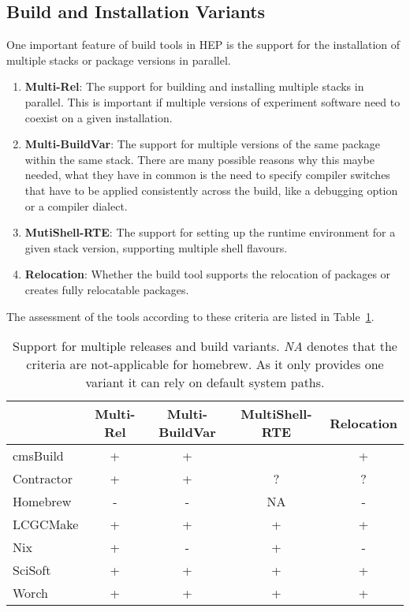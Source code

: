\documentclass[12pt,a4paper]{article}
\begin{document}
\subsection{Build and Installation Variants}
One important feature of build tools in HEP is the support for the installation of multiple stacks or package versions in parallel. 
\begin{enumerate}
\item \textbf{Multi-Rel}: The support for building and installing multiple stacks in parallel. This is important if multiple versions of experiment software need to coexist on a given installation.
\item \textbf{Multi-BuildVar}: The support for multiple versions of the same package within the same stack. There are many possible reasons why this maybe needed, what they have in common is the need to specify compiler switches that have to be applied consistently across the build, like a debugging option or a compiler dialect.
\item \textbf{MutiShell-RTE}: The support for setting up the runtime environment for a given stack version, supporting multiple shell flavours.
\item \textbf{Relocation}: Whether the build tool supports the relocation of packages or creates fully relocatable packages.
\end{enumerate}

The assessment of the tools according to these criteria are listed in Table~\ref{tab:taxonomyVariants}.

\begin{table}
\centering
\begin{tabular}{lcccc}
&Multi-Rel & Multi-BuildVar & MultiShell-RTE & Relocation \\ \hline
cmsBuild & \cellcolor{green} +  & \cellcolor{green} + & \cellcolor{green} & \cellcolor{green} + \\
Contractor & \cellcolor{green} + & \cellcolor{green} + & ? & ? \\
Homebrew &  \cellcolor{red} - & \cellcolor{red} -   & \cellcolor{yellow} NA   & \cellcolor{red} -  \\
LCGCMake & \cellcolor{green} + & \cellcolor{green} + & \cellcolor{green} + & \cellcolor{green} +\\
Nix & \cellcolor{green} + & \cellcolor{red} - & \cellcolor{green} +  & \cellcolor{red} -\\
SciSoft &  \cellcolor{green} + & \cellcolor{green} + &  \cellcolor{green} + & \cellcolor{green} + \\
Worch &  \cellcolor{green} + &  \cellcolor{green}  + &  \cellcolor{green} + &  \cellcolor{green} +
\end{tabular}
\caption{\label{tab:taxonomyVariants}Support for multiple releases and build variants. \emph{NA} denotes that the criteria are not-applicable for homebrew. As it only provides one variant it can rely on default system paths.}
\end{table}
\end{document}
